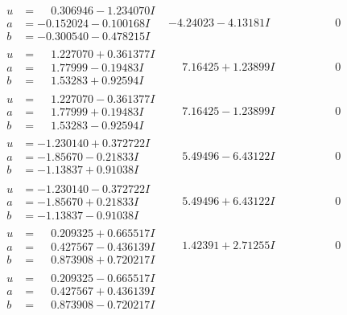 \documentclass[1p]{elsarticle_modified}
\theoremstyle{definition}
\begin{document}
$$\begin{array}{c|c|c}
\begin{aligned}
u &= \phantom{-}0.306946 - 1.234070 I \\
a &= -0.152024 - 0.100168 I \\
b &= -0.300540 - 0.478215 I\end{aligned}
 & -4.24023 - 4.13181 I & \phantom{-0.000000 } 0 \\ \hline\begin{aligned}
u &= \phantom{-}1.227070 + 0.361377 I \\
a &= \phantom{-}1.77999 - 0.19483 I \\
b &= \phantom{-}1.53283 + 0.92594 I\end{aligned}
 & \phantom{-}7.16425 + 1.23899 I & \phantom{-0.000000 } 0 \\ \hline\begin{aligned}
u &= \phantom{-}1.227070 - 0.361377 I \\
a &= \phantom{-}1.77999 + 0.19483 I \\
b &= \phantom{-}1.53283 - 0.92594 I\end{aligned}
 & \phantom{-}7.16425 - 1.23899 I & \phantom{-0.000000 } 0 \\ \hline\begin{aligned}
u &= -1.230140 + 0.372722 I \\
a &= -1.85670 - 0.21833 I \\
b &= -1.13837 + 0.91038 I\end{aligned}
 & \phantom{-}5.49496 - 6.43122 I & \phantom{-0.000000 } 0 \\ \hline\begin{aligned}
u &= -1.230140 - 0.372722 I \\
a &= -1.85670 + 0.21833 I \\
b &= -1.13837 - 0.91038 I\end{aligned}
 & \phantom{-}5.49496 + 6.43122 I & \phantom{-0.000000 } 0 \\ \hline\begin{aligned}
u &= \phantom{-}0.209325 + 0.665517 I \\
a &= \phantom{-}0.427567 - 0.436139 I \\
b &= \phantom{-}0.873908 + 0.720217 I\end{aligned}
 & \phantom{-}1.42391 + 2.71255 I & \phantom{-0.000000 } 0 \\ \hline\begin{aligned}
u &= \phantom{-}0.209325 - 0.665517 I \\
a &= \phantom{-}0.427567 + 0.436139 I \\
b &= \phantom{-}0.873908 - 0.720217 I\end{aligned}

\end{array}$$
\end{document}
